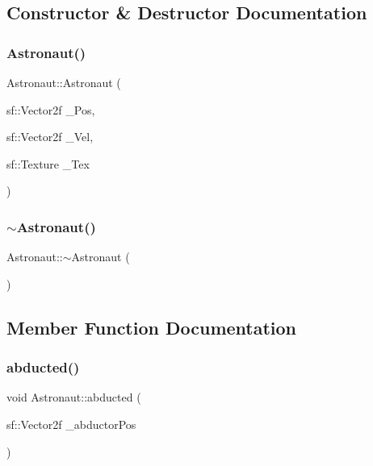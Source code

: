 \subsection{Constructor \& Destructor Documentation}
\mbox{\label{class_astronaut_ad88a1f14ffa4e13ebc9d996a7def9c74}} 
\subsubsection{\texorpdfstring{Astronaut()}{Astronaut()}}
{\footnotesize\ttfamily Astronaut\+::\+Astronaut (\begin{DoxyParamCaption}\item[{sf\+::\+Vector2f}]{\+\_\+\+Pos,  }\item[{sf\+::\+Vector2f}]{\+\_\+\+Vel,  }\item[{sf\+::\+Texture}]{\+\_\+\+Tex }\end{DoxyParamCaption})}

\mbox{\label{class_astronaut_af31f9de205719a042df5f0a1879ee064}} 
\subsubsection{\texorpdfstring{$\sim$\+Astronaut()}{~Astronaut()}}
{\footnotesize\ttfamily Astronaut\+::$\sim$\+Astronaut (\begin{DoxyParamCaption}{ }\end{DoxyParamCaption})}



\subsection{Member Function Documentation}
\mbox{\label{class_astronaut_a33359ffc0867f0e6c83a63ed39659848}} 
\subsubsection{\texorpdfstring{abducted()}{abducted()}}
{\footnotesize\ttfamily void Astronaut\+::abducted (\begin{DoxyParamCaption}\item[{sf\+::\+Vector2f}]{\+\_\+abductor\+Pos }\end{DoxyParamCaption})}


